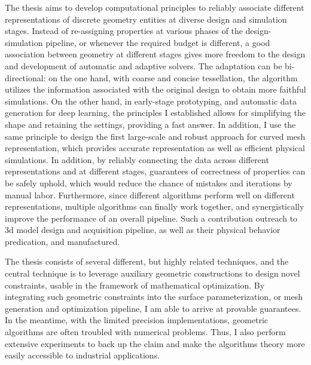 The thesis aims to develop computational principles to reliably associate different representations of discrete geometry entities at diverse design and simulation stages. Instead of re-assigning properties at various phases of the design-simulation pipeline, or whenever the required budget is different, a good association between geometry at different stages gives more freedom to the design and development of automatic and adaptive solvers. The adaptation can be bi-directional: on the one hand, with coarse and concise tessellation, the algorithm utilizes the information associated with the original design to obtain more faithful simulations. On the other hand, in early-stage prototyping, and automatic data generation for deep learning, the principles I established allows for simplifying the shape and retaining the settings, providing a fast answer. In addition, I use the same principle to design the first large-scale and robust approach for curved mesh representation, which provides accurate representation as well as efficient physical simulations.
In addition, by reliably connecting the data across different representations and at different stages, guarantees of correctness of properties can be safely uphold, which would reduce the chance of mistakes and iterations by manual labor. 
Furthermore,  since different algorithms perform well on different representations, multiple algorithms can finally work together, and synergistically improve the performance of an overall pipeline.
Such a contribution outreach to 3d model design and acquisition pipeline, as well as their physical behavior predication, and manufactured.

The thesis consists of several different, but highly related techniques, and the central technique is to leverage auxiliary geometric constructions to design novel constraints, usable in the framework of mathematical optimization. 
By integrating such geometric constraints into the surface parameterization, or mesh generation and optimization pipeline, I am able to arrive at provable guarantees. 
In the meantime, with the limited precision implementations, geometric algorithms are often troubled with numerical problems. Thus, I also perform extensive experiments to back up the claim and make the algorithms theory more easily accessible to industrial applications.

